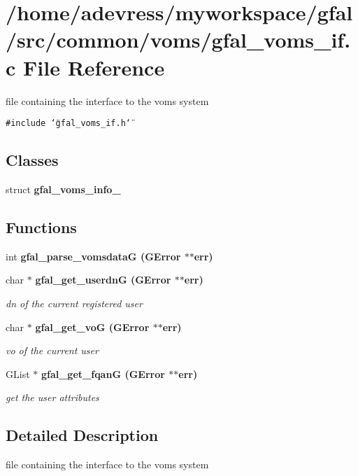 \section{/home/adevress/myworkspace/gfal/src/common/voms/gfal\_\-voms\_\-if.c File Reference}
\label{gfal__voms__if_8c}
file containing the interface to the voms system 

{\tt \#include \char`\"{}gfal\_\-voms\_\-if.h\char`\"{}}\par
\subsection*{Classes}
\begin{CompactItemize}
\item 
struct \textbf{gfal\_\-voms\_\-info\_\-}
\end{CompactItemize}
\subsection*{Functions}
\begin{CompactItemize}
\item 
int \bf{gfal\_\-parse\_\-vomsdata\-G} (GError $\ast$$\ast$err)
\item 
char $\ast$ \bf{gfal\_\-get\_\-userdn\-G} (GError $\ast$$\ast$err)
\begin{CompactList}\small\item\em dn of the current registered user \item\end{CompactList}\item 
char $\ast$ \bf{gfal\_\-get\_\-vo\-G} (GError $\ast$$\ast$err)
\begin{CompactList}\small\item\em vo of the current user \item\end{CompactList}\item 
GList $\ast$ \bf{gfal\_\-get\_\-fqan\-G} (GError $\ast$$\ast$err)
\begin{CompactList}\small\item\em get the user attributes \item\end{CompactList}\end{CompactItemize}


\subsection{Detailed Description}
file containing the interface to the voms system 

